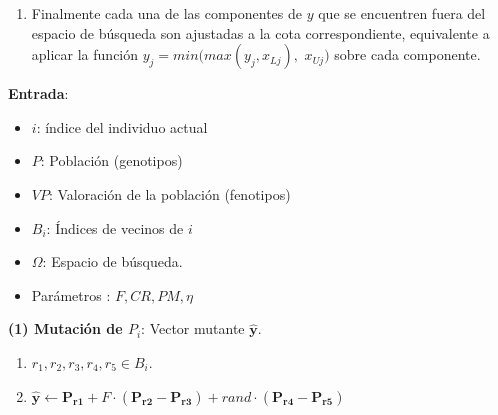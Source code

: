 \begin{enumerate}
        \item Finalmente cada una de las componentes de $y$ que se encuentren fuera del espacio de búsqueda son ajustadas a la cota correspondiente, equivalente a aplicar la función $y_j = min(max(y_j ,x_{Lj}),$ $x_{Uj})$ sobre cada componente.\\
        
    \end{enumerate}

\noindent
    \begin{minipage}{\textwidth}
    \begin{algorithm}[H]
    \SetAlgoLined
     \vspace{0.2cm}\textbf{Entrada}:
    \begin{multicols}{2}
    
     \begin{itemize}
         \vspace{0.15cm}\item $i$: índice del individuo actual 
         \vspace{0.15cm}\item $P$: Población (genotipos)
         \vspace{0.15cm}\item $VP$: Valoración de la población (fenotipos)
         \vspace{0.15cm}\item $B_i$: Índices de vecinos de $i$
         \vspace{0.15cm}\item $\Omega$: Espacio de búsqueda.
         \vspace{0.15cm}\item Parámetros : $F, CR, PM, \eta$
     \end{itemize}
     \end{multicols}
    
    \begin{multicols}{2}
     \vspace{0.2cm} \textbf{(1) Mutación de $P_i$}: Vector mutante $\boldsymbol{\hat{y}}$.
            \begin{enumerate}
                \item $r_1, r_2, r_3, r_4, r_5 \in B_i$.
                \item $\boldsymbol{\hat{y}} \gets \boldsymbol{P_{r1}} + F \cdot (\boldsymbol{P_{r2}} - \boldsymbol{P_{r3}}) + rand \cdot(\boldsymbol{P_{r4}} - \boldsymbol{P_{r5}}) $
            \end{enumerate}
            

\end{multicols}
\end{algorithm}
\end{minipage}

